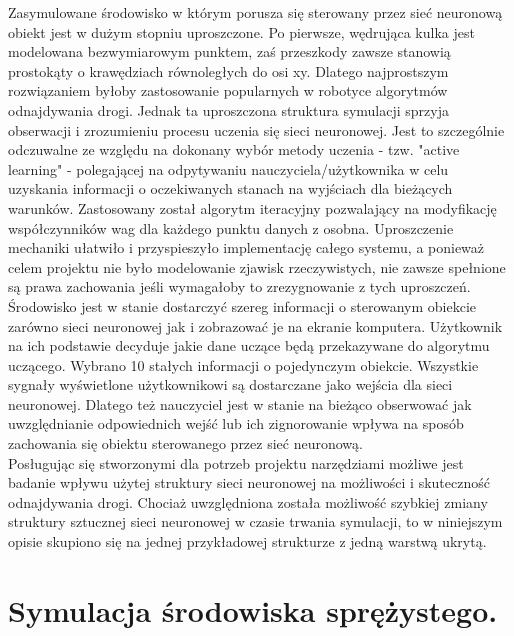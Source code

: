 \documentclass{article}
\begin{document}
\indent Zasymulowane środowisko w którym porusza się sterowany przez sieć neuronową obiekt jest w dużym stopniu uproszczone. Po pierwsze, wędrująca kulka jest modelowana bezwymiarowym punktem, zaś przeszkody zawsze stanowią prostokąty o krawędziach równoległych do osi xy. Dlatego najprostszym rozwiązaniem byłoby zastosowanie popularnych w robotyce algorytmów odnajdywania drogi. Jednak ta uproszczona struktura symulacji sprzyja obserwacji i zrozumieniu procesu uczenia się sieci neuronowej. Jest to szczególnie odczuwalne ze względu na dokonany wybór metody uczenia - tzw. "active learning" - polegającej na odpytywaniu nauczyciela/użytkownika w celu uzyskania informacji o oczekiwanych stanach na wyjściach dla bieżących warunków. Zastosowany został algorytm iteracyjny pozwalający na modyfikację współczynników wag dla każdego punktu danych z osobna. Uproszczenie mechaniki ułatwiło i przyspieszyło implementację całego systemu, a ponieważ celem projektu nie było modelowanie zjawisk rzeczywistych, nie zawsze spełnione są prawa zachowania jeśli wymagałoby to zrezygnowanie z tych uproszczeń.
\\

\indent Środowisko jest w stanie dostarczyć szereg informacji o sterowanym obiekcie zarówno sieci neuronowej jak i zobrazować je na ekranie komputera. Użytkownik na ich podstawie decyduje jakie dane uczące będą przekazywane do algorytmu uczącego. Wybrano 10 stałych informacji o pojedynczym obiekcie. Wszystkie sygnały wyświetlone użytkownikowi są dostarczane jako wejścia dla sieci neuronowej. Dlatego też nauczyciel jest w stanie na bieżąco obserwować jak uwzględnianie odpowiednich wejść lub ich zignorowanie wpływa na sposób zachowania się obiektu sterowanego przez sieć neuronową.
\\

\indent Posługując się stworzonymi dla potrzeb projektu narzędziami możliwe jest badanie wpływu użytej struktury sieci neuronowej na możliwości i skuteczność odnajdywania drogi. Chociaż uwzględniona została możliwość szybkiej zmiany struktury sztucznej sieci neuronowej w czasie trwania symulacji, to w niniejszym opisie skupiono się na jednej przykładowej strukturze z jedną warstwą ukrytą.

\section{Symulacja środowiska sprężystego.}
\end{document}
